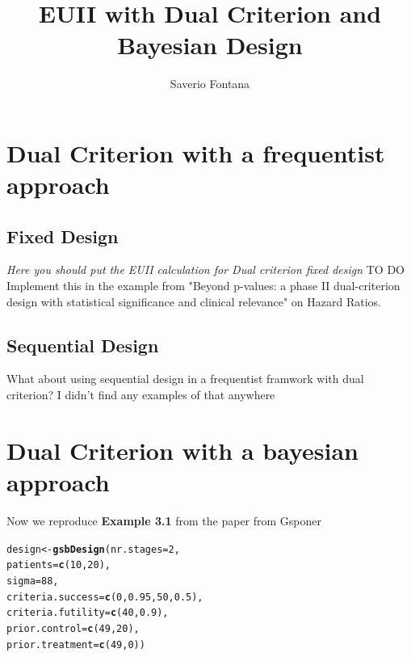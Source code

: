 \documentclass{article}\usepackage[]{graphicx}\usepackage[]{xcolor}
\title{EUII with Dual Criterion and Bayesian Design}
\author{Saverio Fontana}
\makeatletter
\newcommand{\hlnum}[1]{\textcolor[rgb]{0.686,0.059,0.569}{#1}}%
\newcommand{\hldef}[1]{\textcolor[rgb]{0.345,0.345,0.345}{#1}}%
\newcommand{\hlkwb}[1]{\textcolor[rgb]{0.69,0.353,0.396}{#1}}%
\newcommand{\hlkwc}[1]{\textcolor[rgb]{0.333,0.667,0.333}{#1}}%
\newcommand{\hlkwd}[1]{\textcolor[rgb]{0.737,0.353,0.396}{\textbf{#1}}}%
\newenvironment{kframe}{%
 \def\at@end@of@kframe{}%
 \ifinner\ifhmode%
  \def\at@end@of@kframe{\end{minipage}}%
  \begin{minipage}{\columnwidth}%
 \fi\fi%
 \def\FrameCommand##1{\hskip\@totalleftmargin \hskip-\fboxsep
 \colorbox{shadecolor}{##1}\hskip-\fboxsep
     \hskip-\linewidth \hskip-\@totalleftmargin \hskip\columnwidth}%
 \MakeFramed {\advance\hsize-\width
   \@totalleftmargin\z@ \linewidth\hsize
   \@setminipage}}%
 {\par\unskip\endMakeFramed%
 \at@end@of@kframe}
\newenvironment{knitrout}{}{} %
\makeatother
\begin{document}
    
\maketitle   
  


\section*{Dual Criterion with a frequentist approach}
\subsection{Fixed Design}
\textit{Here you should put the EUII calculation for Dual criterion fixed design}
TO DO 
Implement this in the example from "Beyond p-values: a phase II dual-criterion design with statistical significance and clinical relevance" on
Hazard Ratios.

\subsection{Sequential Design}
What about using sequential design in a frequentist framwork with dual criterion? I didn't find any examples of that anywhere


\section*{Dual Criterion with a bayesian approach}


Now we reproduce \textbf{Example 3.1} from the paper from Gsponer \cite{gsponer2014bayesian}

\begin{knitrout}
\color{fgcolor}\begin{kframe}
\begin{alltt}
\hldef{design} \hlkwb{<-} \hlkwd{gsbDesign}\hldef{(}\hlkwc{nr.stages} \hldef{=} \hlnum{2}\hldef{,}
                    \hlkwc{patients} \hldef{=} \hlkwd{c}\hldef{(}\hlnum{10}\hldef{,}\hlnum{20}\hldef{),}
                    \hlkwc{sigma}\hldef{=}\hlnum{88}\hldef{,}
                    \hlkwc{criteria.success} \hldef{=} \hlkwd{c}\hldef{(}\hlnum{0}\hldef{,}\hlnum{0.95}\hldef{,}\hlnum{50}\hldef{,}\hlnum{0.5}\hldef{),}
                    \hlkwc{criteria.futility} \hldef{=} \hlkwd{c}\hldef{(}\hlnum{40}\hldef{,}\hlnum{0.9}\hldef{),}
                    \hlkwc{prior.control} \hldef{=} \hlkwd{c}\hldef{(}\hlnum{49}\hldef{,}\hlnum{20}\hldef{),}
                    \hlkwc{prior.treatment} \hldef{=} \hlkwd{c}\hldef{(}\hlnum{49}\hldef{,}\hlnum{0}\hldef{))}
\end{alltt}
\end{kframe}
\end{knitrout}
\end{document}
